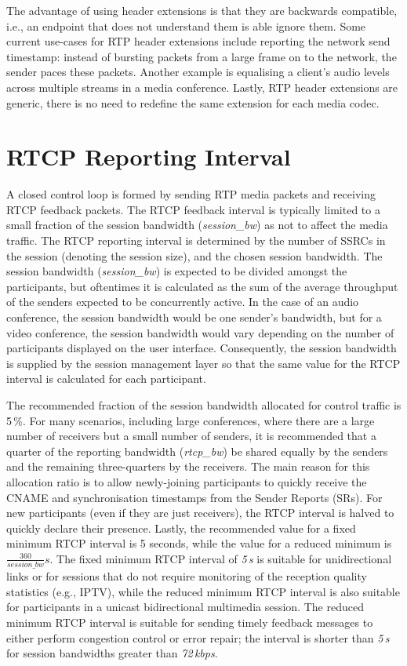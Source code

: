 The advantage of using header extensions is that they are backwards
compatible, i.e., an endpoint that does not understand them is able ignore
them. Some current use-cases for RTP header extensions include reporting the
network send timestamp: instead of bursting packets from a large frame on to
the network, the sender paces these packets.  Another example is equalising a
client's audio levels across multiple streams in a media conference. Lastly,
RTP header extensions are generic, there is no need to redefine the same extension
for each media codec.

\section{RTCP Reporting Interval}

A closed control loop is formed by sending RTP media packets and receiving
RTCP feedback packets. The RTCP feedback interval is typically limited to a
small fraction of the session bandwidth (\emph{session\_bw}) as not to affect the media traffic.
The RTCP reporting interval is determined by the number of SSRCs in the
session (denoting the session size), and the chosen session bandwidth. The
session bandwidth (\emph{session\_bw}) is expected to be divided amongst the participants, but
oftentimes it is calculated as the sum of the average throughput of the
senders expected to be concurrently active. In the case of an audio conference,
the session bandwidth would be one sender's bandwidth, but for a video
conference, the session bandwidth would vary depending on the number of participants displayed on
the user interface. Consequently, the session bandwidth is supplied by the
session management layer so that the same value for the RTCP interval is calculated for each participant.


The recommended fraction of the session bandwidth allocated for control
traffic is 5\,\%. For many scenarios, including large conferences, where there
are a large number of receivers but a small number of senders, it is
recommended that a quarter of the reporting bandwidth (\emph{rtcp\_bw}) be
shared equally by the senders and the remaining three-quarters by the receivers. The
main reason for this allocation ratio is to allow newly-joining participants to quickly receive the
CNAME and synchronisation timestamps from the Sender Reports (SRs).
For new participants (even if they are just receivers), the RTCP
interval is halved to quickly declare their presence.  Lastly, the recommended
value for a fixed minimum RTCP interval is 5 seconds, while the value for a
reduced minimum is $\frac{360}{session\_bw}s$.  The fixed minimum RTCP
interval of \emph{5\,s} is suitable for unidirectional links or for sessions
that do not require monitoring of the reception quality statistics (e.g., IPTV),
while the reduced minimum RTCP interval is also suitable for participants in a
unicast bidirectional multimedia session. The reduced minimum RTCP interval
is suitable for sending timely feedback messages to either perform congestion
control or error repair; the interval is shorter than \emph{5\,s} for session
bandwidths greater than \emph{72\,kbps}.

